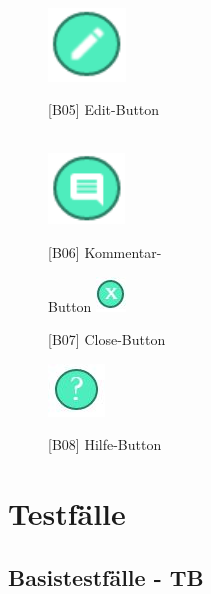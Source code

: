 \documentclass[a4paper]{scrreprt}
\begin{document}
\begin{figure}[h!]
\begin{minipage}[t]{0.45\linewidth}
    			\label{fig:figure1}
    			\end{minipage}
    			\hspace{0.5cm}
    			\begin{minipage}[t]{0.45\linewidth}
    			\flushright
    			\centering
    			\vspace{9mm}
    			\hfill \\
    			\includegraphics[width=0.05\textheight]{edit_button.PNG}
    			\caption{{[}B05{]} Edit-Button}
    			\label{fig:figure1}
    			\hfill \\
    			\includegraphics[width=0.05\textheight]{comment_button.PNG}
    			\caption{{[}B06{]} Kommentar-} {Button}
    			\label{fig:figure1}
			\includegraphics[width=0.04\textheight]{closebutton.JPG}
    			\caption{{[}B07{]} Close-Button}
    			\label{fig:figure1}
    			\includegraphics[width=0.05\textheight]{hilfebutton.JPG}
    			\caption{{[}B08{]} Hilfe-Button}
    			\label{fig:figure1}
    			\end{minipage}
    		\end{figure}
    
    	\clearpage

    \chapter{Testfälle}
    
    	\section{Basistestfälle - TB}    
    	
\end{document}
